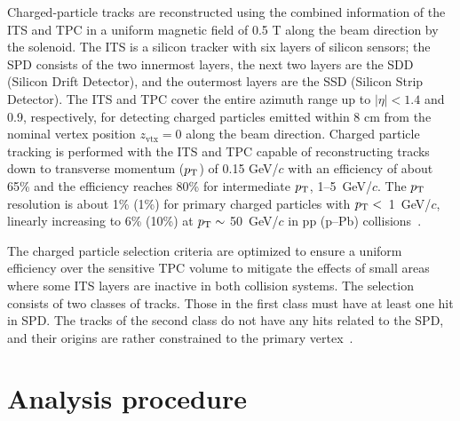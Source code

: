 Charged-particle tracks are reconstructed using the combined information of the ITS and TPC in a uniform magnetic field of 0.5 T along the beam direction by the solenoid. The ITS is a silicon tracker with six layers of silicon sensors; the SPD consists of the two innermost layers, the next two layers are the SDD (Silicon Drift Detector), and the outermost layers are the SSD (Silicon Strip Detector). The ITS and TPC cover the entire azimuth range up to $|\eta|<1.4$ and 0.9, respectively, for detecting charged particles emitted within 8 cm from the nominal vertex position $z_\mathrm{vtx}=0$ along the beam direction. Charged particle tracking is performed with the ITS and TPC capable of reconstructing tracks down to transverse momentum ($p_\mathrm{T}$) of 0.15 GeV/$c$ with an efficiency of about 65\% and the efficiency reaches 80\% for intermediate $p_\mathrm{T}$, 1--5~GeV/$c$. The $p_\mathrm{T}$ resolution is about 1\% (1\%) for primary charged particles with $p_\mathrm{T}<$~1~GeV/$c$, linearly increasing to 6\% (10\%) at $p_\mathrm{T}\sim$ 50~GeV/$c$ in pp (p--Pb) collisions~\cite{ALICE:2018vuu}. 

The charged particle selection criteria are optimized to ensure a uniform efficiency over the sensitive TPC volume to mitigate the effects of small areas where some ITS layers are inactive in both collision systems. The selection consists of two classes of tracks. Those in the first class must have at least one hit in SPD. The tracks of the second class do not have any hits related to the SPD, and their origins are rather constrained to the primary vertex~\cite{ALICE:2012eyl}. 

\section{Analysis procedure}
\label{sec:ana}
